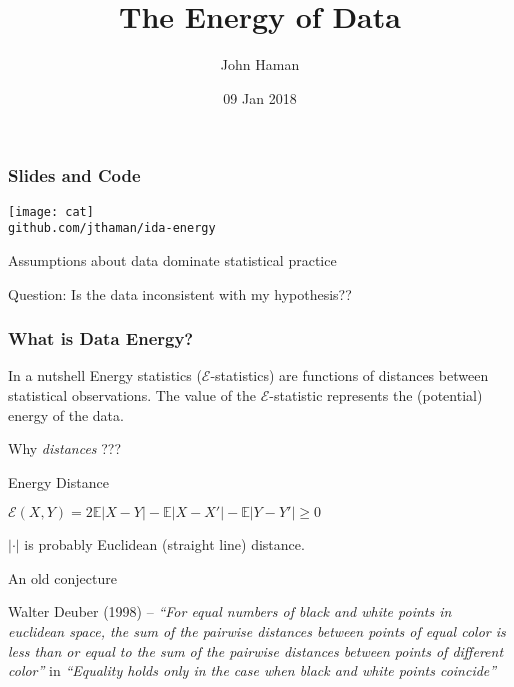 \documentclass[presentation]{beamer}
\author{John Haman}
\institute{Bowling Green State University, Institute for Defense Analyses}
\date{09 Jan 2018}
\title{The Energy of Data}
\begin{document}
\maketitle

\begin{frame}
  \frametitle{Slides and Code}
  \centering
  \texttt{[image: cat]}\\
  \centering
  \texttt{github.com/jthaman/ida-energy}
\end{frame}

\begin{frame}
  Assumptions about data dominate statistical practice
  \begin{block}{Question:}
    Is the data inconsistent with my hypothesis??
  \end{block}
\end{frame}

\begin{frame}
  \frametitle{What is Data Energy?}
  \begin{centering}
    \begin{block}{In a nutshell}
      Energy statistics ($\mathcal{E}$-statistics) are functions of
      distances between statistical observations. The value of the
      $\mathcal{E}$-statistic represents the (potential) energy of the
      data.
    \end{block}
  \end{centering}
  \pause
  \begin{center}
    Why \textit{distances} ??? 
  \end{center}
\end{frame}


\begin{frame}
  \begin{block}{Energy Distance}
    \begin{center}
      $\mathcal{E}(X,Y) = 2\mathbb{E}|X - Y| - \mathbb{E}|X - X'| -
      \mathbb{E}|Y - Y'| \geq 0$
    \end{center}
  \end{block}
  \centering
  $|\cdot|$ is probably Euclidean (straight line) distance.
\end{frame}


\begin{frame}{An old conjecture}
  \begin{block}{Walter Deuber (1998) -- }
    \textit{``For equal numbers of black and white points in euclidean
      space, the sum of the pairwise distances between points of equal
      color is less than or equal to the sum of the pairwise distances
      between points of different color''}  in
    \textit{``Equality holds only in the case when black and white
      points coincide''}
  \end{block}
\end{frame}
\end{document}
